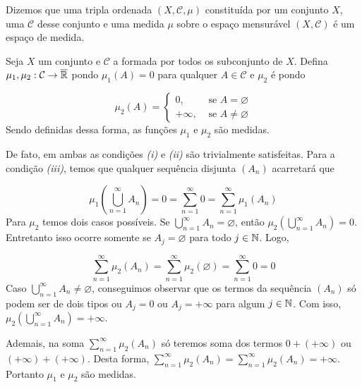 \begin{definition}
	\label{def:espaço-de-medida}
	Dizemos que uma tripla ordenada $(X, \mathcal{C}, \mu)$ constituída por um conjunto $X$, uma \sigal $\mathcal{C}$ desse conjunto e uma medida $\mu$ sobre o espaço mensurável $(X, \mathcal{C})$ é um espaço de medida.
\end{definition}



\begin{example}
    Seja $X$ um conjunto e $\mathcal{C}$ a \sigal formada por todos os subconjunto de $X$.    
    Defina $\mu_1, \mu_2:\mathcal{C} \to \operatorname{\overline{\mathbb{R}}}$ pondo $\mu_1(A) = 0$ para qualquer  $A \in \mathcal{C}$ e 
    $\mu_2$ é  pondo 

$$\mu_2(A) = \left\{\begin{array}{cc}
0, & \textrm{\ se \ } A = \varnothing \\
+\infty,& \textrm{\ se \ } A \neq \varnothing
\end{array}\right.$$
Sendo definidas dessa forma, as funções $\mu_1$ e $\mu_2$ são medidas.
\end{example}

De fato, em ambas as condições \textit{(i)} e \textit{(ii)} são trivialmente satisfeitas.
Para a condição \textit{(iii)}, temos que qualquer sequência disjunta $(A_n)$ acarretará que

$$\mu_1\left(\bigcup_{n = 1}^\infty A_n\right) = 0 = \sum_{n = 1}^\infty 0 = \sum_{n = 1}^\infty \mu_1(A_n) $$
Para $\mu_2$ temos dois casos possíveis.
Se  $\displaystyle \bigcup_{n = 1}^\infty A_n  = \varnothing$, então $\mu_2\left(\displaystyle \bigcup_{n = 1}^\infty A_n\right) = 0$. Entretanto isso ocorre somente se $A_j = \varnothing$ para todo $j \in \operatorname{\mathbb{N}}$.
Logo, 

$$\sum_{n = 1}^\infty \mu_2(A_n) = \sum_{n = 1}^\infty \mu_2(\varnothing) = \sum_{n = 1}^\infty 0 = 0$$
Caso $\displaystyle \bigcup_{n = 1}^\infty A_n  \neq  \varnothing$, conseguimos observar que os termos da sequência $(A_n)$ só podem ser de dois tipos ou $A_j = 0$ ou $A_j = +\infty$ para algum $j \in \operatorname{\mathbb{N}}$. Com isso,  $\mu_2\left(\displaystyle \bigcup_{n = 1}^\infty A_n\right) = +\infty$.

Ademais, na soma $\displaystyle \sum_{n = 1}^\infty \mu_2(A_n)$ só teremos soma dos termos $0 + (+ \infty)$ ou $(+\infty) + (+\infty)$.
Desta forma, $\displaystyle \sum_{n = 1}^\infty \mu_2(A_n) = \sum_{n = 1}^\infty \mu_2(A_n) = +\infty$.
Portanto $\mu_1$ e $\mu_2$ são medidas.

